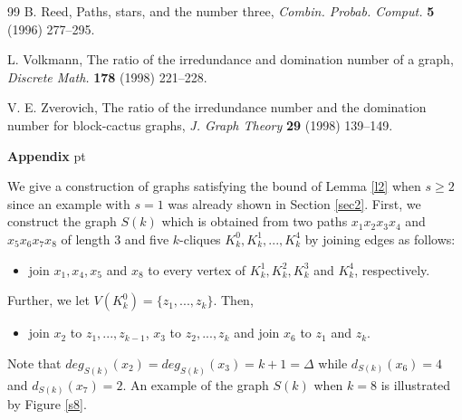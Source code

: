 \documentclass[11pt]{article}
\newcommand{\2}{ \vspace{0.2cm} }
\newcommand{\1}{ \vspace{0.1cm} }
\begin{document}
\begin{thebibliography}{99}
 B. Reed,  Paths, stars, and the number three, \textit{Combin. Probab. Comput.} \textbf{5} (1996) 277--295.


 L. Volkmann, The ratio of the irredundance and domination number of a graph, \textit{Discrete Math.} \textbf{178} (1998) 221--228.


 V. E. Zverovich, The ratio of the irredundance number and the domination number for  block-cactus graphs, \textit{J. Graph Theory} \textbf{29} (1998) 139--149.


\end{thebibliography}



\noindent \textbf{Appendix}
 pt


\indent We give a construction of graphs satisfying the bound of Lemma \ref{l2} when $s \geq 2$ since an example with $s = 1$ was already shown in Section \ref{sec2}. First, we  construct the graph $S(k)$ which is obtained from two paths $x_{1}x_{2}x_{3}x_{4}$ and $x_{5}x_{6}x_{7}x_{8}$ of length 3 and five $k$-cliques $K^{0}_{k}, K^{1}_{k}, ..., K^{4}_{k}$ by joining edges as follows:
\begin{itemize}
  \item join $x_{1}, x_{4}, x_{5}$ and $x_{8}$ to every vertex of $K^{1}_{k}, K^{2}_{k}, K^{3}_{k}$ and $K^{4}_{k}$, respectively.
\end{itemize}
\noindent Further, we let $V(K^{0}_{k}) = \{z_{1}, ..., z_{k}\}$. Then,
\begin{itemize}
  \item join $x_{2}$ to $z_{1}, ..., z_{k - 1}$, $x_{3}$ to $z_{2}, ..., z_{k}$ and join $x_{6}$ to $z_{1}$ and $z_{k}$.
\end{itemize}


\noindent Note that $deg_{S(k)}(x_{2}) = deg_{S(k)}(x_{3}) = k + 1 = \Delta$ while $d_{S(k)}(x_{6}) = 4$ and $d_{S(k)}(x_{7}) = 2$. An example of the graph $S(k)$ when $k = 8$ is illustrated by Figure \ref{s8}.
\end{document}
